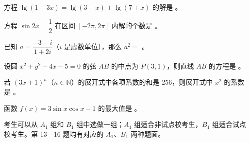 \begin{question}
方程 $\lg(1-3x)=\lg(3-x)+\lg(7+x)$ 的解是 \gkblank{}。

\end{question}
\begin{question}
方程 $\sin 2x=\dfrac12$ 在区间 $[-2\pi,2\pi]$ 内解的个数是 \gkblank{}。

\end{question}
\begin{question}
已知 $a=\dfrac{-3-i}{1+2i}$（$i$ 是虚数单位），那么 $a^2=$ \gkblank{}。

\end{question}
\begin{question}
设圆 $x^2+y^2-4x-5=0$ 的弦 $AB$ 的中点为 $P(3,1)$，则直线 $AB$ 的方程是 \gkblank{}。

\end{question}
\begin{question}
若 $(3x+1)^n$（$n\in\mathbb N$）的展开式中各项系数的和是 256，则展开式中 $x^2$ 的系数是 \gkblank{}。

\end{question}
\begin{question}
函数 $f(x)=3\sin x\cos x-1$ 的最大值是 \gkblank{}。

\end{question}

考生可以从 $A_1$ 组和 $B_1$ 组中选做一组；$A_1$ 组适合非试点校考生，$B_1$ 组适合试点校考生。第 13—16 题均有对应的 $A_1$、$B_1$ 两种题面。

